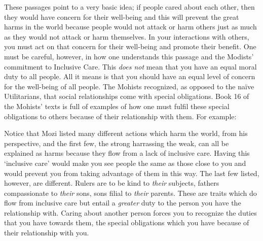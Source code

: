 
These passages point to a very basic idea; if people cared about each other, then they would have concern for their well-being and this will prevent the great harms in the world because people would not attack or harm others just as much as they would not attack or harm themselves. In your interactions with others, you must act on that concern for their well-being and promote their benefit. One must be careful, however, in how one understands this passage and the Modists' commitment to Inclusive Care. This \emph{does not} mean that you have an equal moral duty to all people. All it means is that you should have an equal level of concern for the well-being of all people. The Mohists recognized, as opposed to the na\"ive Utilitarians, that social relationships come with special obligations. Book 16 of the Mohists' texts is full of examples of how one must fulfil these special obligations to others because of their relationship with them.\autocite{BackYoungsun1} For example: 


Notice that Mozi listed many different actions which harm the world, from his perspective, and the first few, the strong harrassing the weak, can all be explained as harms because they flow from a lack of inclusive care. Having this `inclusive care' would make you see people the same as those close to you and would prevent you from taking advantage of them in this way. The last few listed, however, are different. Rulers are to be kind to \emph{their} subjects, fathers compassionate to \emph{their} sons, sons filial to \emph{their} parents. These are traits which do flow from inclusive care but entail a \emph{greater} duty to the person you have the relationship with. Caring about another person forces you to recognize the duties that you have towards them, the special obligations which you have because of their relationship with you. 

